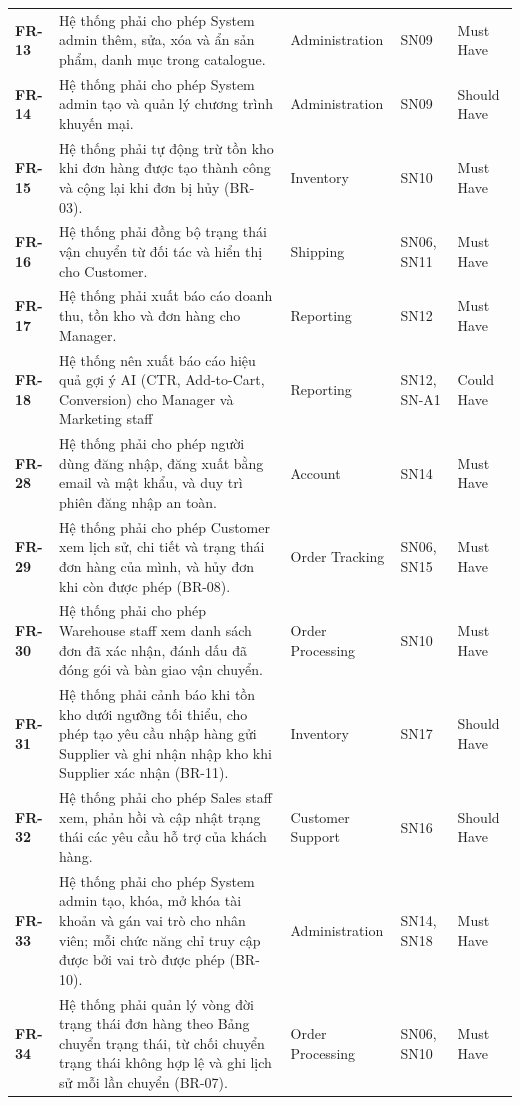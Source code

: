 \documentclass[12pt,a4paper,oneside]{report}
\begin{document}
\begin{longtable}{p{1.6cm}p{7.4cm}p{2.9cm}p{1.9cm}p{2.2cm}}
\textbf{FR-13} & Hệ thống phải cho phép System admin thêm, sửa, xóa và ẩn sản phẩm, danh mục trong catalogue. & Administration & SN09 & Must Have \\
\textbf{FR-14} & Hệ thống phải cho phép System admin tạo và quản lý chương trình khuyến mại. & Administration & SN09 & Should Have \\
\textbf{FR-15} & Hệ thống phải tự động trừ tồn kho khi đơn hàng được tạo thành công và cộng lại khi đơn bị hủy (BR-03). & Inventory & SN10 & Must Have \\
\textbf{FR-16} & Hệ thống phải đồng bộ trạng thái vận chuyển từ đối tác và hiển thị cho Customer. & Shipping & SN06, SN11 & Must Have \\
\textbf{FR-17} & Hệ thống phải xuất báo cáo doanh thu, tồn kho và đơn hàng cho Manager. & Reporting & SN12 & Must Have \\
\textbf{FR-18} & Hệ thống nên xuất báo cáo hiệu quả gợi ý AI (CTR, Add-to-Cart, Conversion) cho Manager và Marketing staff & Reporting & SN12, SN-A1 & Could Have \\
\textbf{FR-28} & Hệ thống phải cho phép người dùng đăng nhập, đăng xuất bằng email và mật khẩu, và duy trì phiên đăng nhập an toàn. & Account & SN14 & Must Have \\
\textbf{FR-29} & Hệ thống phải cho phép Customer xem lịch sử, chi tiết và trạng thái đơn hàng của mình, và hủy đơn khi còn được phép (BR-08). & Order Tracking & SN06, SN15 & Must Have \\
\textbf{FR-30} & Hệ thống phải cho phép Warehouse staff xem danh sách đơn đã xác nhận, đánh dấu đã đóng gói và bàn giao vận chuyển. & Order Processing & SN10 & Must Have \\
\textbf{FR-31} & Hệ thống phải cảnh báo khi tồn kho dưới ngưỡng tối thiểu, cho phép tạo yêu cầu nhập hàng gửi Supplier và ghi nhận nhập kho khi Supplier xác nhận (BR-11). & Inventory & SN17 & Should Have \\
\textbf{FR-32} & Hệ thống phải cho phép Sales staff xem, phản hồi và cập nhật trạng thái các yêu cầu hỗ trợ của khách hàng. & Customer Support & SN16 & Should Have \\
\textbf{FR-33} & Hệ thống phải cho phép System admin tạo, khóa, mở khóa tài khoản và gán vai trò cho nhân viên; mỗi chức năng chỉ truy cập được bởi vai trò được phép (BR-10). & Administration & SN14, SN18 & Must Have \\
\textbf{FR-34} & Hệ thống phải quản lý vòng đời trạng thái đơn hàng theo Bảng chuyển trạng thái, từ chối chuyển trạng thái không hợp lệ và ghi lịch sử mỗi lần chuyển (BR-07). & Order Processing & SN06, SN10 & Must Have \\
\end{longtable}
\end{document}

